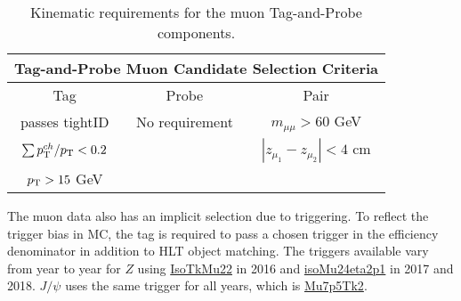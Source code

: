 \begin{table}
\small
\caption{Kinematic requirements for the muon Tag-and-Probe components.}
\centering
\begin{tabular}{|c|c|c|}
\hline 
\multicolumn{3}{|c|}{Tag-and-Probe Muon Candidate Selection Criteria} \\ 
\hline 
\hline
Tag & Probe & Pair \\ 
\hline 
\hline
passes tightID & No requirement & $m_{\mu\mu} > 60$ GeV \\
$\sum p_{\mathrm{T}}^{ch} / p_{\mathrm{T}} < 0.2$ & &  $|z_{\mu_1} - z_{\mu_2}| <4 $ cm \\
$p_{\mathrm{T}} > 15$ GeV &   &   \\
\hline 
\end{tabular} 
\label{tab:mutnpselect}
\end{table}

The muon data also has an implicit selection due to triggering. To reflect the trigger bias in MC, the tag is required to pass a chosen trigger in the efficiency denominator in addition to HLT object matching. The triggers available vary from year to year for $Z$ using \url{IsoTkMu22} in 2016 and \url{isoMu24eta2p1} in 2017 and 2018. $J/\psi$ uses the same trigger for all years, which is \url{Mu7p5Tk2}.\\







